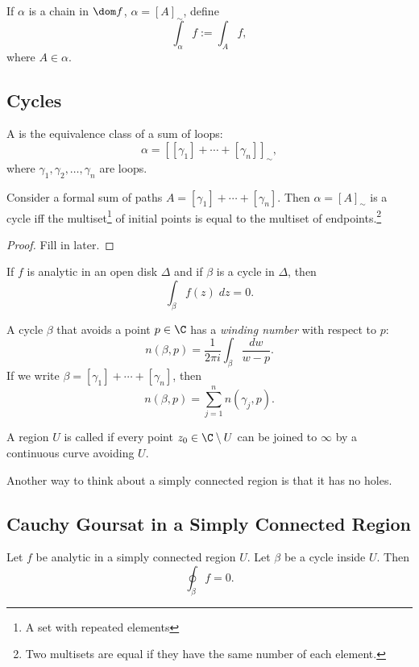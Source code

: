 \begin{definition}
    If $\alpha$ is a chain in $\dom f$, $\alpha = {[A]}_{\sim}$,
    define
    \[ \int_{\alpha} f := \int_A f, \]
    where $A \in \alpha$.
\end{definition}

\subsection{Cycles}
\begin{definition}
    A  is the equivalence class of a sum of loops:
    \[ \alpha = {[ [\gamma_1] + \cdots + [\gamma_n]]}_{\sim}, \]
    where $\gamma_1, \gamma_2, \ldots, \gamma_n$ are loops.
\end{definition}

\begin{theorem}
    Consider a formal sum of paths $A = [\gamma_1] + \cdots + 
    [\gamma_n]$.
    Then $\alpha = {[A]}_{\sim}$ is a cycle iff the multiset\footnote{A set with repeated elements} of initial points is equal
    to the multiset of endpoints.\footnote{Two multisets are 
    equal if they have the same number of each element.}
\end{theorem}

\begin{proof}
    Fill in later.
\end{proof}
 
\begin{theorem}
    If $f$ is analytic in an open disk $\Delta$ and if $\beta$
    is a cycle in $\Delta$, then
    \[ \int_{\beta} f(z) \; dz = 0. \]
\end{theorem}
A cycle $\beta$ that avoids a point $p \in \C$ has a 
\textit{winding number} with respect to $p$:
\[ n(\beta, p) = \frac{1}{2\pi i}\int_{\beta} \frac{dw}{w-p}.\]
If we write $\beta = [\gamma_1] + \cdots + [\gamma_n]$, then
\[ n(\beta, p) = \sum_{j=1}^n n(\gamma_j, p). \]

\begin{definition}
    A region $U$ is called  if every point
    $z_0 \in \C \setminus U$ can be joined to $\infty$ by a
    continuous curve avoiding $U$.
\end{definition}

Another way to think about a simply connected region is that
it has no holes.

\subsection{Cauchy Goursat in a Simply Connected Region}
\begin{theorem}
    Let $f$ be analytic in a simply connected region $U$.
    Let $\beta$ be a cycle inside $U$.
    Then 
    \[ \oint_{\beta} f = 0. \]
\end{theorem}

